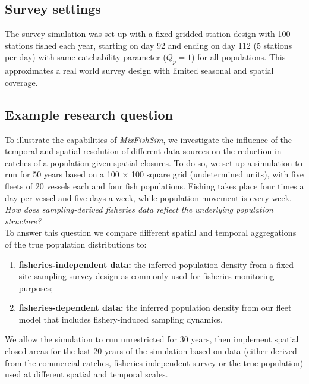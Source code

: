 \documentclass[preprint]{elsarticle}
\begin{document}
\subsection{Survey settings}

The survey simulation was set up with a fixed gridded station design with 100
stations fished each year, starting on day 92 and ending on day 112 (5 stations
per day) with same catchability parameter ($Q_{p} = 1$) for all populations.
This approximates a real world survey design with limited seasonal and spatial
coverage. 

\subsection{Example research question}

To illustrate the capabilities of \textit{MixFishSim}, we investigate the
influence of the temporal and spatial resolution of different data sources on
the reduction in catches of a population given spatial closures. To do so, we
set up a simulation to run for 50 years based on a 100 $\times$ 100 square grid
(undetermined units), with five fleets of 20 vessels each and four fish
populations. Fishing takes place four times a day per vessel and five days a
week, while population movement is every week. \\

\textit{How does sampling-derived fisheries data reflect the underlying
	population structure?} \\

To answer this question we compare different spatial and temporal aggregations
of the true population distributions to:
\begin{enumerate}[label=\alph*)]
	\item \textbf{fisheries-independent data:} the inferred population
		density from a fixed-site sampling survey design as commonly
		used for
		fisheries monitoring purposes;
	\item \textbf{fisheries-dependent data:} the inferred population
		density from our fleet model that includes fishery-induced
		sampling dynamics.
\end{enumerate}

We allow the simulation to run unrestricted for 30 years, then implement
spatial closed areas for the last 20 years of the simulation based on data
(either derived from the commercial catches, fisheries-independent survey or
the true population) used at different spatial and temporal scales. \\
\end{document}
